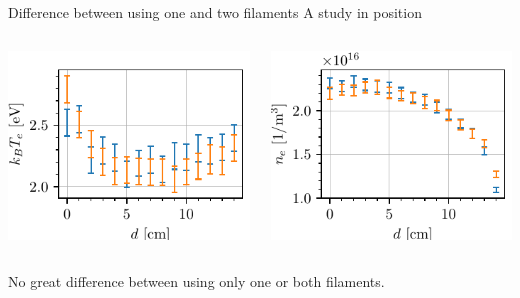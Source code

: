\documentclass[10pt]{beamer}
\begin{document}
\begin{frame}{Difference between using one and two filaments}
    {A study in position}
    \begin{columns}
        \centering
        \includegraphics[scale=1]{../figures/temperatureeV_position_twofilaments.pdf}

        \centering
        \includegraphics[scale=1]{../figures/density_position_twofilaments.pdf}

    \end{columns}
    \vspace{0.5cm}
    No great difference between using only one or both filaments.
\end{frame}
\end{document}
